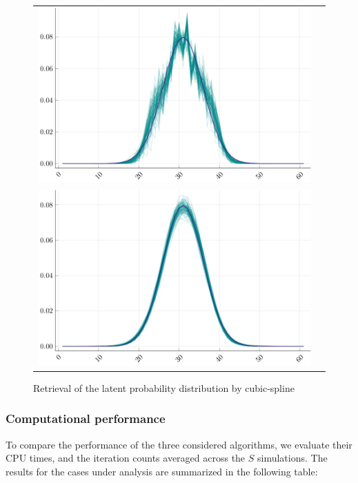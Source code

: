 \begin{figure}[h]
\begin{tabular}[b]{c c }
		 \includegraphics[width=.50\textwidth]{Figures/3/W.pdf}\\
		\includegraphics[width=.50\textwidth]{Figures/4/W.pdf} &    \\
	\end{tabular}

	\caption{Retrieval of the latent probability distribution by cubic-spline}
	\label{fig:cubicspline}
\end{figure}


\subsubsection{Computational performance}


To compare the performance of the three considered algorithms, we evaluate their CPU times, and the iteration counts averaged across the $S$ simulations. The results for the cases under analysis are summarized in the following table:

